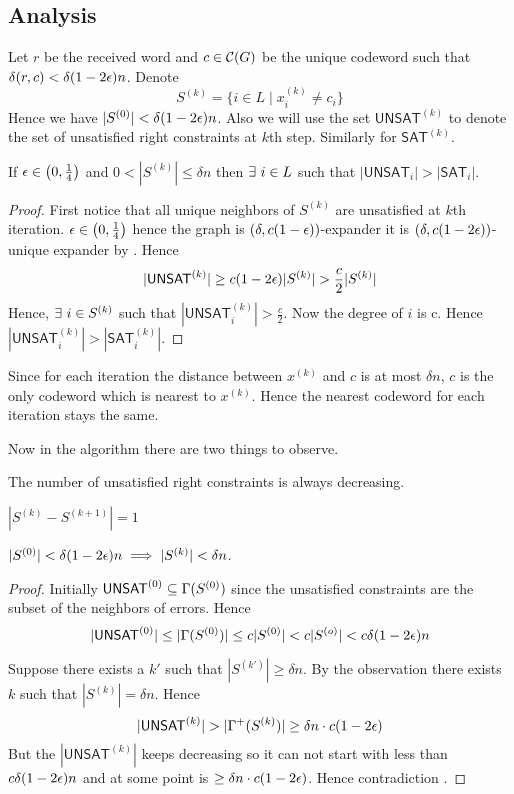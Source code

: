 \subsection{Analysis}
Let $r$ be the received word and $c\in \mathcal{C}(G)$ be the unique codeword such that $\delta(r,c)<\delta(1-2\epsilon)n$. Denote $$S^{(k)}=\{i\in L\mid x_i^{(k)}\neq c_i\}$$Hence we have $|S^{(0)}|<\delta(1-2\epsilon)n$. Also we will use the set $\mathsf{UNSAT}^{(k)}$ to denote the set of unsatisfied right constraints at $k$th step. Similarly for $\mathsf{SAT}^{(k)}$.
\begin{lemma}\label{exdecodelem1}
	If $\epsilon\in\left( 0,\frac14\right)$ and $0<|S^{(k)}|\leq \delta n$ then $\exists\ i\in L$ such that $|\mathsf{UNSAT}_i|>|\mathsf{SAT}_i|$.
\end{lemma}
\begin{proof}
	First notice that all unique neighbors of $S^{(k)}$ are unsatisfied at $k$th iteration. $\epsilon\in \left(0,\frac14\right)$ hence the graph is $(\delta,c(1-\epsilon))$-expander it is  $(\delta,c(1-2\epsilon))$-unique expander by . Hence $$|\mathsf{UNSAT}^{(k)}|\geq c(1-2\eps)|S^{(k)}|> \frac{c}{2}|S^{(k)}|$$Hence, $\exists\ i\in S^{(k)}$ such that $|\mathsf{UNSAT}_i^{(k)}|>\frac{c}2$. Now the degree of $i$ is c. Hence $|\mathsf{UNSAT}_i^{(k)}|>|\mathsf{SAT}_i^{(k)}|$. 
\end{proof}
Since for each iteration the distance between $x^{(k)}$ and $c$ is at most $\delta n$, $c$ is the only codeword which is nearest to $x^{(k)}$. Hence the nearest codeword for each iteration stays the same.

Now in the algorithm there are two things to observe.
\begin{observation}
	The number of unsatisfied right constraints is always decreasing.
\end{observation}
\begin{observation}
	$|S^{(k)}-S^{(k+1)}|=1$
\end{observation}
\begin{lemma}\label{exdecodelem2}
	$|S^{(0)}|<\delta(1-2\epsilon)n\implies |S^{(k)}|<\delta n$.
\end{lemma}
\begin{proof}
	Initially $\mathsf{UNSAT}^{(0)}\subseteq {\Gamma(S^{(0)})}$ since the unsatisfied constraints are the subset of the neighbors of errors. Hence $$|\mathsf{UNSAT}^{(0)}|\leq|{\Gamma(S^{(0)})}|\leq c|S^{(0)}|<c|S^{(o)}|<c\delta(1-2\epsilon)n$$
	
	Suppose there exists a $k'$ such that $|S^{(k')}|\geq \delta n$. By the observation there exists $k$ such that $|S^{(k)}|=\delta n$. Hence $$|\mathsf{UNSAT}^{(k)}|>|\Gm^+(S^{(k)})|\geq \delta n\cdot c(1-2\eps)$$But the $|\mathsf{UNSAT}^{(k)}|$ keeps decreasing so it can not start with less than $c\delta(1-2\epsilon)n$ and at some point is $\geq \delta n\cdot c(1-2\epsilon)$. Hence contradiction \ctr.
\end{proof}

